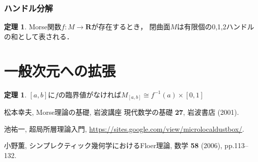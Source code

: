 \documentclass[11pt, a4paper, dvipdfmx]{jsarticle}
\theoremstyle{definition}
\newcommand{\rr}{\mathbf{R}}
\theoremstyle{mystyle}
\newtheorem{THM}[Axiom]{定理}
\numberwithin{equation}{section} %
\begin{document}
\subsubsection{ハンドル分解}

\begin{THM}
    Morse関数$f\colon M\to\rr$が存在するとき，
    閉曲面$M$は有限個の0,1,2ハンドルの和として表される．
\end{THM}
\section{一般次元への拡張}

\begin{THM}\label{thm:crit-diff}
    $[a,b]$に$f$の臨界値がなければ$M_{[a,b]}\cong f^{-1}(a)\times[0,1]$
\end{THM}




\begin{thebibliography}{15}

 松本幸夫, Morse理論の基礎, 岩波講座 現代数学の基礎 {\bf 27}, 岩波書店 (2001). 

 池祐一, 超局所層理論入門, \url{https://sites.google.com/view/microlocaldustbox/}. 

 小野薫, シンプレクティック幾何学におけるFloer理論, 数学 \textbf{58} (2006), pp.113--132.

\end{thebibliography}
\end{document}
